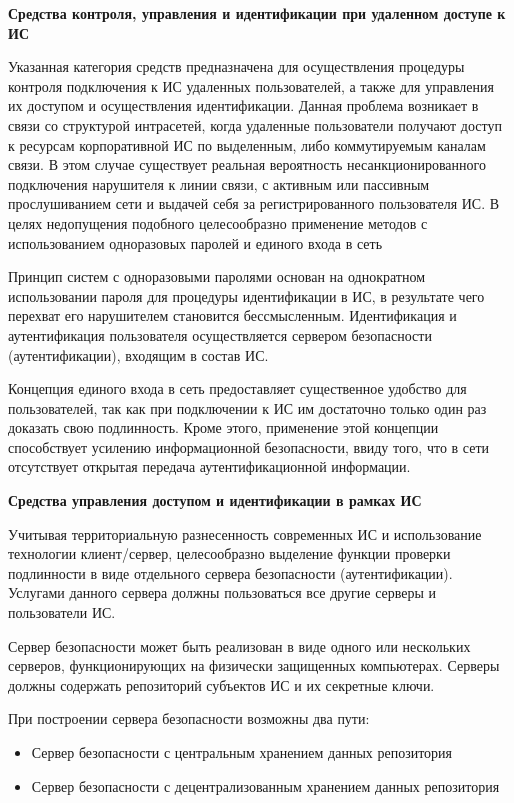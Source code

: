 \bigbreak
\textbf{Средства контроля, управления и идентификации при удаленном доступе к ИС}

Указанная категория средств предназначена для осуществления процедуры контроля подключения к ИС удаленных пользователей,
а также для управления их доступом и осуществления идентификации. Данная проблема возникает в связи со структурой
интрасетей, когда удаленные пользователи получают доступ к ресурсам корпоративной ИС по выделенным,
либо коммутируемым каналам связи. В этом случае существует реальная вероятность несанкционированного подключения
нарушителя к линии связи, с активным или пассивным прослушиванием сети и выдачей себя за
регистрированного пользователя ИС. В целях недопущения подобного целесообразно применение методов с
использованием одноразовых паролей и единого входа в сеть

Принцип систем с одноразовыми паролями основан на однократном использовании пароля для процедуры
идентификации в ИС, в результате чего перехват его нарушителем становится бессмысленным.
Идентификация и аутентификация пользователя осуществляется сервером безопасности (аутентификации), входящим в состав ИС.

Концепция единого входа в сеть предоставляет существенное удобство для пользователей, так как при
подключении к ИС им достаточно только один раз доказать свою подлинность. Кроме этого, применение
этой концепции способствует усилению информационной безопасности, ввиду того, что в сети
отсутствует открытая передача аутентификационной информации.

\bigbreak
\textbf{Средства управления доступом и идентификации в рамках ИС}

Учитывая территориальную разнесенность современных ИС и использование технологии клиент/сервер,
целесообразно выделение функции проверки подлинности в виде отдельного сервера безопасности (аутентификации).
Услугами данного сервера должны пользоваться все другие серверы и пользователи ИС.

Сервер безопасности может быть реализован в виде одного или нескольких серверов, функционирующих на физически
защищенных компьютерах. Серверы должны содержать репозиторий субъектов ИС и их секретные ключи.

При построении сервера безопасности возможны два пути:
\begin{itemize}
    \item Сервер безопасности с центральным хранением данных репозитория
    \item Сервер безопасности с децентрализованным хранением данных репозитория
\end{itemize}

